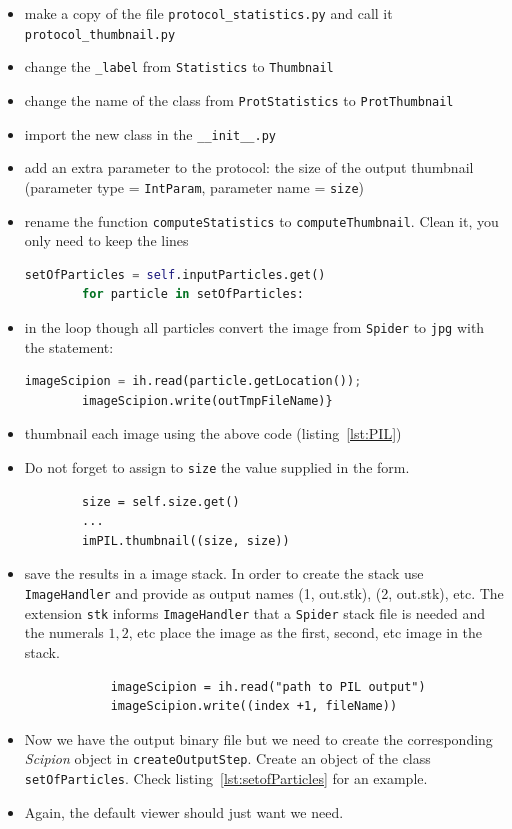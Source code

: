 \documentclass[12pt]{article} %
\def\scipion{\textit{Scipion}\xspace}
\newcommand{\ttt}[1]{\texttt{#1}}
\begin{document}
\begin{itemize}
 \item make a copy of the file \ttt{protocol\_statistics.py} and call it \ttt{protocol\_thumbnail.py}
 \item change the \ttt{\_label} from \ttt{Statistics} to \ttt{Thumbnail}
 \item change the name of the class from \ttt{ProtStatistics} to \ttt{ProtThumbnail}
 \item import the new class in the \ttt{\_\_init\_\_.py}
 \item add an extra parameter to the protocol: the size of the output thumbnail (parameter type = \ttt{IntParam}, parameter name = \ttt{size})
 \item rename the function \ttt{computeStatistics} to \ttt{computeThumbnail}. Clean it, you only need to keep the lines 
\begin{lstlisting}[language=Python]
        setOfParticles = self.inputParticles.get()
        for particle in setOfParticles:
\end{lstlisting}

 \item in the loop though all particles convert the image from \ttt{Spider} to \ttt{jpg} with the statement:
 \begin{lstlisting}[language=Python]
        imageScipion = ih.read(particle.getLocation());
        imageScipion.write(outTmpFileName)}
\end{lstlisting}
 
 \item thumbnail each image  using the above code (listing~\ref{lst:PIL})
 \item Do not forget to assign to \ttt{size} the value supplied in the form. \begin{lstlisting}
        size = self.size.get()
        ...
        imPIL.thumbnail((size, size))
 \end{lstlisting}
 
 \item save the results in a image stack. In order to create the stack use \ttt{ImageHandler} and
 provide as output names (1, out.stk), (2, out.stk), etc. The extension \ttt{stk} informs \ttt{ImageHandler} that a \ttt{Spider} stack file is needed and the numerals $1, 2$, etc  place the image as the first, second, etc image in the stack.
 \begin{lstlisting}
            imageScipion = ih.read("path to PIL output")
            imageScipion.write((index +1, fileName))
 \end{lstlisting}
 \item Now we have the output binary file but we need to create the corresponding \scipion object in \ttt{createOutputStep}.
 Create an object of the class \ttt{setOfParticles}. Check listing~\ref{lst:setofParticles} for an example.
 \item Again, the default viewer should just want we need.
 \end{itemize}
\end{document}
